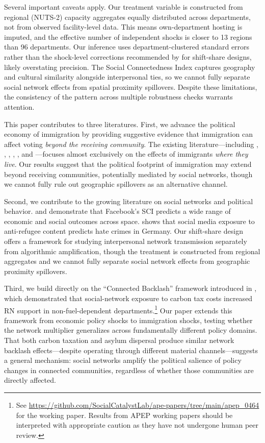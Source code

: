 \documentclass[12pt]{article}
\begin{document}
Several important caveats apply. Our treatment variable is constructed from regional (NUTS-2) capacity aggregates equally distributed across departments, not from observed facility-level data. This means own-department hosting is imputed, and the effective number of independent shocks is closer to 13 regions than 96 departments. Our inference uses department-clustered standard errors rather than the shock-level corrections recommended by \citet{adao2019shift} for shift-share designs, likely overstating precision. The Social Connectedness Index captures geography and cultural similarity alongside interpersonal ties, so we cannot fully separate social network effects from spatial proximity spillovers. Despite these limitations, the consistency of the pattern across multiple robustness checks warrants attention.

This paper contributes to three literatures. First, we advance the political economy of immigration by providing suggestive evidence that immigration can affect voting \textit{beyond the receiving community}. The existing literature---including \citet{tabellini2020gifts}, \citet{dustmann2019refugee}, \citet{steinmayr2021contact}, \citet{schneider2024stranger}, \citet{halla2017immigration}, and \citet{edo2019immigration}---focuses almost exclusively on the effects of immigrants \textit{where they live}. Our results suggest that the political footprint of immigration may extend beyond receiving communities, potentially mediated by social networks, though we cannot fully rule out geographic spillovers as an alternative channel.

Second, we contribute to the growing literature on social networks and political behavior. \citet{bailey2018social} and \citet{bailey2020social} demonstrate that Facebook's SCI predicts a wide range of economic and social outcomes across space. \citet{muller2021social} shows that social media exposure to anti-refugee content predicts hate crimes in Germany. Our shift-share design offers a framework for studying interpersonal network transmission separately from algorithmic amplification, though the treatment is constructed from regional aggregates and we cannot fully separate social network effects from geographic proximity spillovers.

Third, we build directly on the ``Connected Backlash'' framework introduced in \citet{apep0464connected}, which demonstrated that social-network exposure to carbon tax costs increased RN support in non-fuel-dependent departments.\footnote{See \url{https://github.com/SocialCatalystLab/ape-papers/tree/main/apep_0464} for the working paper. Results from APEP working papers should be interpreted with appropriate caution as they have not undergone human peer review.} Our paper extends this framework from economic policy shocks to immigration shocks, testing whether the network multiplier generalizes across fundamentally different policy domains. That both carbon taxation and asylum dispersal produce similar network backlash effects---despite operating through different material channels---suggests a general mechanism: social networks amplify the political salience of policy changes in connected communities, regardless of whether those communities are directly affected.
\end{document}
